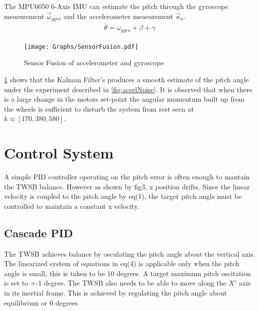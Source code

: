         The MPU6050 6-Axis IMU can estimate the pitch through the gyroscope measurement $\vec\omega_{gyro}$ and the accelerometer measurement $\vec a_{x}$.
        \begin{equation}
            \begin{aligned}
                \dot\theta = \omega_{gyro} + \beta + \gamma
            \end{aligned}
            \label{eq:gyroBias}
        \end{equation}

            



       


        \begin{figure}[H]
            \centering
            \texttt{[image: Graphs/SensorFusion.pdf]}
            \caption{Sensor Fusion of accelerometer and gyroscope}
            \label{fig:SensorFusion}
        \end{figure}

       
        \ref{fig:SensorFusion} shows that the Kalman Filter's produces a smooth estimate of the pitch angle
        under the experiment described in \ref{fig:accelNoise}. It is observed that when there is a 
        large change in the motors set-point  the angular momentum built up from the wheels is sufficient to 
        disturb the system from rest seen at $k \approx [170, 380, 580]$.
        \pagebreak{}
    \section{Control System}
        A simple PID controller operating on the pitch error is often enough to mantain the TWSB balance.
        However as shown by fig3, x position drifts. Since the linear velocity is coupled to the
        pitch angle by eq(1), the target pitch angle must be controlled to maintain a constant x velocity. 

        \subsection{Cascade PID}

        The TWSB achieves balance by osculating the pitch angle about the vertical axis. 
        The linearized system of equations in eq(4) is applicable 
        only when the pitch angle is small, this is taken to be 10 degrees. 
        A target maximum pitch oscitation is set to +-1 degree. 
        The TWSB also needs to be able to move along the $X'$ axis in its inertial frame.
        This is achieved by regulating the pitch angle about equilibrium or 0 degrees.

